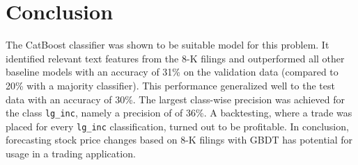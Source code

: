\documentclass{article}
\begin{document}
	\section{Conclusion}

	The CatBoost classifier was shown to be suitable model for this problem. It identified relevant text features from the 8-K filings and outperformed all other baseline models with an accuracy of 31\% on the validation data (compared to 20\% with a majority classifier). This performance generalized well to the test data with an accuracy of 30\%. The largest class-wise precision was achieved for the class \lstinline{lg_inc}, namely a precision of of 36\%. A backtesting, where a trade was placed for every \lstinline{lg_inc} classification, turned out to be profitable. In conclusion, forecasting stock price changes based on 8-K filings with GBDT has potential for usage in a trading application. 
	
\clearpage
\printbibliography
\end{document}
